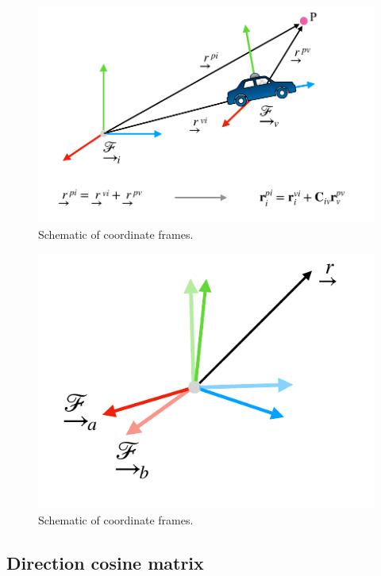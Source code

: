 \begin{figure}[!htb]
\begin{center}
\includegraphics[scale=0.290]{img/coordinate_transforms/coordinate_rotations_2.jpeg}
\end{center}
\caption{Schematic of coordinate frames.}
\label{coordinate_rotations_2}
\end{figure}


\begin{figure}[!htb]
\begin{center}
\includegraphics[scale=0.290]{img/coordinate_transforms/coordinate_rotations_1.jpeg}
\end{center}
\caption{Schematic of coordinate frames.}
\label{coordinate_rotations_1}
\end{figure}

\subsection{Direction cosine matrix}
\label{direction_cosine_matrix}

